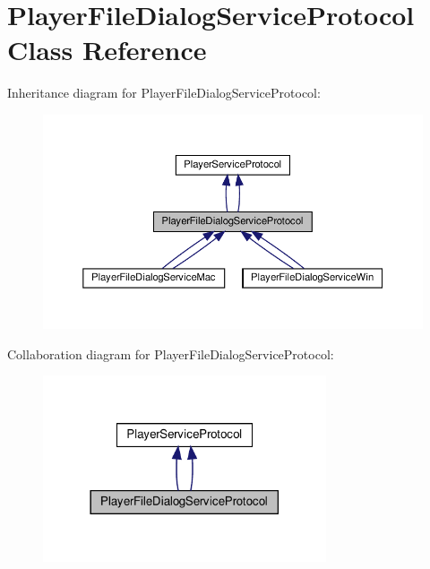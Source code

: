 \hypertarget{classPlayerFileDialogServiceProtocol}{}\section{Player\+File\+Dialog\+Service\+Protocol Class Reference}
\label{classPlayerFileDialogServiceProtocol}


Inheritance diagram for Player\+File\+Dialog\+Service\+Protocol\+:
\nopagebreak
\begin{figure}[H]
\begin{center}
\leavevmode
\includegraphics[width=350pt]{classPlayerFileDialogServiceProtocol__inherit__graph}
\end{center}
\end{figure}


Collaboration diagram for Player\+File\+Dialog\+Service\+Protocol\+:
\nopagebreak
\begin{figure}[H]
\begin{center}
\leavevmode
\includegraphics[width=237pt]{classPlayerFileDialogServiceProtocol__coll__graph}
\end{center}
\end{figure}

